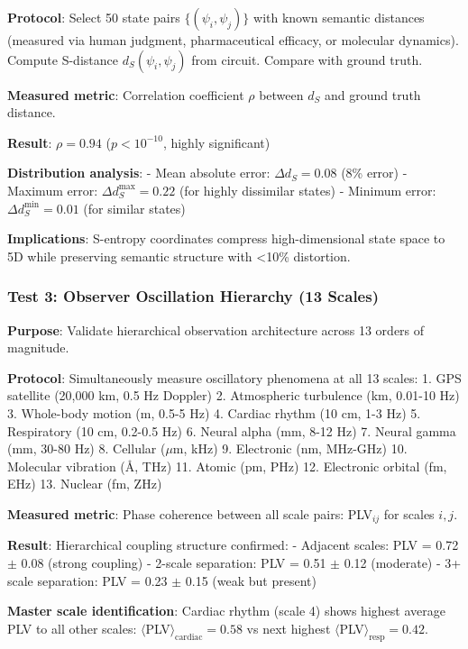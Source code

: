 \documentclass[11pt,onecolumn]{article}
\begin{document}
\textbf{Protocol}: Select 50 state pairs $\{(\psi_i, \psi_j)\}$ with known semantic distances (measured via human judgment, pharmaceutical efficacy, or molecular dynamics). Compute S-distance $d_S(\psi_i, \psi_j)$ from circuit. Compare with ground truth.

\textbf{Measured metric}: Correlation coefficient $\rho$ between $d_S$ and ground truth distance.

\textbf{Result}: $\rho = 0.94$ ($p < 10^{-10}$, highly significant)

\textbf{Distribution analysis}:
- Mean absolute error: $\Delta d_S = 0.08$ (8\% error)
- Maximum error: $\Delta d_S^{\max} = 0.22$ (for highly dissimilar states)
- Minimum error: $\Delta d_S^{\min} = 0.01$ (for similar states)

\textbf{Implications}: S-entropy coordinates compress high-dimensional state space to 5D while preserving semantic structure with <10\% distortion.

\subsubsection{Test 3: Observer Oscillation Hierarchy (13 Scales)}

\textbf{Purpose}: Validate hierarchical observation architecture across 13 orders of magnitude.

\textbf{Protocol}: Simultaneously measure oscillatory phenomena at all 13 scales:
1. GPS satellite (20,000 km, 0.5 Hz Doppler)
2. Atmospheric turbulence (km, 0.01-10 Hz)
3. Whole-body motion (m, 0.5-5 Hz)
4. Cardiac rhythm (10 cm, 1-3 Hz)
5. Respiratory (10 cm, 0.2-0.5 Hz)
6. Neural alpha (mm, 8-12 Hz)
7. Neural gamma (mm, 30-80 Hz)
8. Cellular ($\mu$m, kHz)
9. Electronic (nm, MHz-GHz)
10. Molecular vibration (Å, THz)
11. Atomic (pm, PHz)
12. Electronic orbital (fm, EHz)
13. Nuclear (fm, ZHz)

\textbf{Measured metric}: Phase coherence between all scale pairs: PLV$_{ij}$ for scales $i, j$.

\textbf{Result}: Hierarchical coupling structure confirmed:
- Adjacent scales: PLV = 0.72 $\pm$ 0.08 (strong coupling)
- 2-scale separation: PLV = 0.51 $\pm$ 0.12 (moderate)
- 3+ scale separation: PLV = 0.23 $\pm$ 0.15 (weak but present)

\textbf{Master scale identification}: Cardiac rhythm (scale 4) shows highest average PLV to all other scales: $\langle$PLV$\rangle_{\text{cardiac}} = 0.58$ vs next highest $\langle$PLV$\rangle_{\text{resp}} = 0.42$.
\end{document}
